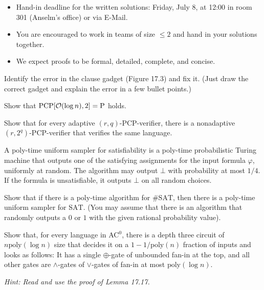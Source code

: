 \documentclass[english]{uebung_cs}
\begin{document}
\begin{itemize}
  \item Hand-in deadline for the written solutions: Friday, July 8, at 12:00 in room 301 (Anselm's office) or via E-Mail.
  \item You are encouraged to work in teams of size $\le 2$ and hand in your solutions together.
  \item We expect proofs to be formal, detailed, complete, and concise.
\end{itemize}

\begin{aufgabe}
  Identify the error in the clause gadget (Figure 17.3) and fix it. (Just draw the correct gadget and explain the error in a few bullet points.)
\end{aufgabe}

\begin{aufgabe}
  Show that $\mathrm{PCP}[\mathcal{O}(\log n),2] = \mathrm{P}$ holds.
\end{aufgabe}

\begin{aufgabe}
  Show that for every adaptive $(r,q)$-PCP-verifier, there is a nonadaptive $(r,2^q)$-PCP-verifier that verifies the same language.
\end{aufgabe}

\begin{aufgabe}
  A poly-time uniform sampler for satisfiability is a poly-time probabilistic Turing machine
  that outputs one of the satisfying assignments for the input formula
  $\varphi$, uniformly at random. The algorithm may output $\bot$ with
  probability at most $1/4$. If the formula is unsatisfiable, it
  outputs $\bot$ on all random choices.

  Show that if there is a poly-time algorithm for $\#\mathrm{SAT}$, then there is a poly-time uniform sampler for $\mathrm{SAT}$. (You may assume that there is an algorithm that randomly outputs a $0$ or $1$ with the given rational probability value).
\end{aufgabe}

\begin{aufgabe}[Exercise 17.6]
Show that, for every language in AC$^0$, there is a depth three circuit of $n \mathrm{poly}(\log n)$ size that decides it on a $1−1/\mathrm{poly}(n)$ fraction of inputs and looks as follows:
It has a single $\oplus$-gate of unbounded fan-in at the top, and all other gates are $\wedge$-gates of $\vee$-gates of fan-in at most $\mathrm{poly}(\log n)$.

\emph{Hint: Read and use the proof of Lemma 17.17.}
\end{aufgabe}
\end{document}
